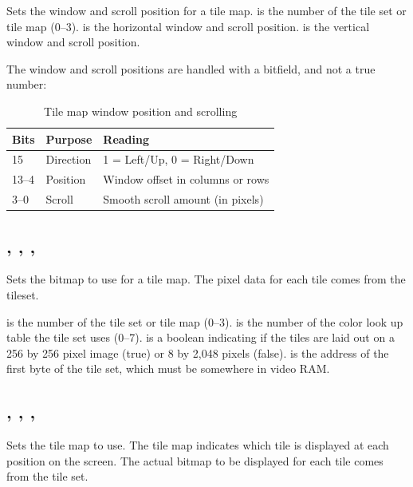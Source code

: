 \documentclass{report}
\begin{document}
    Sets the window and scroll position for a tile map.
     is the number of the tile set or tile map (0--3).
     is the horizontal window and scroll position. 
     is the vertical window and scroll position.

    The window and scroll positions are handled with a bitfield, and not a true number:

    \begin{table}[!htb]
        \begin{center}
            \begin{tabular}{|l|l|l|} \hline
                Bits & Purpose & Reading \\ \hline\hline
                15 & Direction & 1 = Left/Up, 0 = Right/Down \\ \hline
                13--4 & Position & Window offset in columns or rows \\ \hline
                3--0 & Scroll & Smooth scroll amount (in pixels) \\ \hline
            \end{tabular}
        \end{center}
        \caption{Tile map window position and scrolling}
        \label{tile_scroll}
    \end{table}

    \subsection*{ , , , }

    Sets the bitmap to use for a tile map. The pixel data for each tile comes from the tileset.

     is the number of the tile set or tile map (0--3).
     is the number of the color look up table the tile set uses (0--7).
     is a boolean indicating if the tiles are laid out on a 256 by 256 pixel
    image (true) or 8 by 2,048 pixels (false).
     is the address of the first byte of the tile set, which must be somewhere
    in video RAM.

    \subsection*{ , , , }

    Sets the tile map to use. The tile map indicates which tile is displayed at each position on the screen.
    The actual bitmap to be displayed for each tile comes from the tile set.
\end{document}
